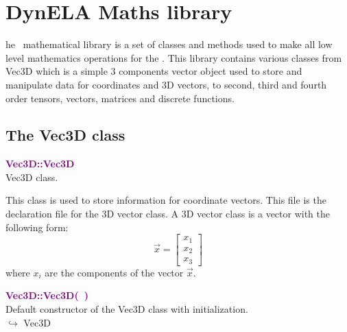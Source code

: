 %
%
%
\chapter{DynELA Maths library}

\startcontents[chapters]
\printmyminitoc[2]he \DynELA~mathematical library is a set of classes and methods used to make all low level mathematics operations for the \DynELA. This library contains various classes from Vec3D which is a simple 3 components vector object used to store and manipulate data for coordinates and 3D vectors, to second, third and fourth order tensors, vectors, matrices and discrete functions.

\section{The Vec3D class}

\textcolor{purple}{\textbf{Vec3D::Vec3D}}\label{Vec3D::Vec3D}\\
Vec3D class.

This class is used to store information for coordinate vectors.
This file is the declaration file for the 3D vector class.
A 3D vector class is a vector with the following form:
\begin{equation*}
\overrightarrow{x}=\left[\begin{array}{c}
  x_{1}\\
  x_{2}\\
  x_{3}
  \end{array}\right]
\end{equation*}
where $x_{i}$ are the components of the vector $\overrightarrow{x}$.

\textcolor{purple}{\textbf{Vec3D::Vec3D(~)}}\label{Vec3D::Vec3D()}\\
Default constructor of the Vec3D class with initialization.\\ \hspace*{10mm}$\hookrightarrow$ Vec3D

